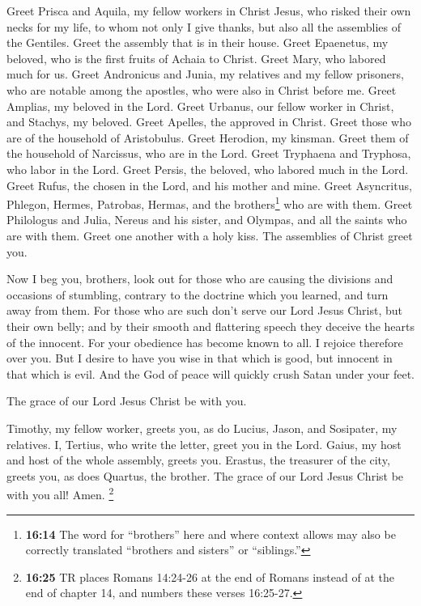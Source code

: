  Greet Prisca and Aquila, my fellow workers in Christ
Jesus,  who risked their own necks for my life, to whom
not only I give thanks, but also all the assemblies of the Gentiles.
 Greet the assembly that is in their house. Greet
Epaenetus, my beloved, who is the first fruits of Achaia to Christ.
 Greet Mary, who labored much for us.  Greet
Andronicus and Junia, my relatives and my fellow prisoners, who are
notable among the apostles, who were also in Christ before me.
 Greet Amplias, my beloved in the Lord. 
Greet Urbanus, our fellow worker in Christ, and Stachys, my beloved.
 Greet Apelles, the approved in Christ. Greet those who
are of the household of Aristobulus.  Greet Herodion, my
kinsman. Greet them of the household of Narcissus, who are in the Lord.
 Greet Tryphaena and Tryphosa, who labor in the Lord.
Greet Persis, the beloved, who labored much in the Lord. 
Greet Rufus, the chosen in the Lord, and his mother and mine.
 Greet Asyncritus, Phlegon, Hermes, Patrobas, Hermas, and
the brothers\footnote{\textbf{16:14} The word for ``brothers'' here and
  where context allows may also be correctly translated ``brothers and
  sisters'' or ``siblings.''} who are with them.  Greet
Philologus and Julia, Nereus and his sister, and Olympas, and all the
saints who are with them.  Greet one another with a holy
kiss. The assemblies of Christ greet you.

 Now I beg you, brothers, look out for those who are
causing the divisions and occasions of stumbling, contrary to the
doctrine which you learned, and turn away from them.  For
those who are such don't serve our Lord Jesus Christ, but their own
belly; and by their smooth and flattering speech they deceive the hearts
of the innocent.  For your obedience has become known to
all. I rejoice therefore over you. But I desire to have you wise in that
which is good, but innocent in that which is evil.  And
the God of peace will quickly crush Satan under your feet.

The grace of our Lord Jesus Christ be with you.

 Timothy, my fellow worker, greets you, as do Lucius,
Jason, and Sosipater, my relatives.  I, Tertius, who
write the letter, greet you in the Lord.  Gaius, my host
and host of the whole assembly, greets you. Erastus, the treasurer of
the city, greets you, as does Quartus, the brother.  The
grace of our Lord Jesus Christ be with you all! Amen. 
\footnote{\textbf{16:25} TR places Romans 14:24-26 at the end of Romans
  instead of at the end of chapter 14, and numbers these verses
  16:25-27.}
